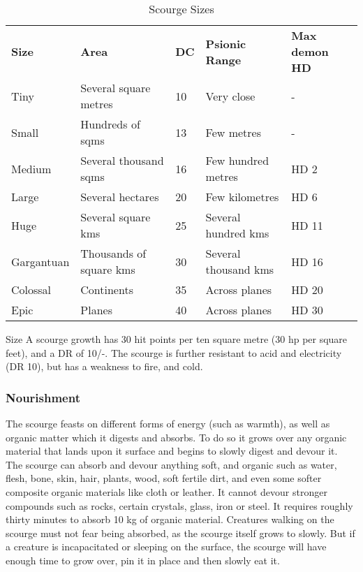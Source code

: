 \begin{table*}[!htb]
  \caption{Scourge Sizes}
  \begin{tabular}{l l l l l}
    \textbf{Size} & \textbf{Area}             & \textbf{DC} & \textbf{Psionic Range} & \textbf{Max demon HD} \\
    Tiny          & Several square metres     & 10          & Very close             & - \\
    Small         & Hundreds of sqms          & 13          & Few metres             & - \\
    Medium        & Several thousand sqms     & 16          & Few hundred metres     & HD 2 \\
    Large         & Several hectares          & 20          & Few kilometres         & HD 6 \\
    Huge          & Several square kms        & 25          & Several hundred kms    & HD 11 \\
    Gargantuan    & Thousands of square kms   & 30          & Several thousand kms   & HD 16 \\
    Colossal      & Continents                & 35          & Across planes          & HD 20 \\
    Epic          & Planes                    & 40          & Across planes          & HD 30 \\
  \end{tabular}
\end{table*}

\begin{35e}{Size}
  A scourge growth has 30 hit points per ten square metre (30 hp per square
  feet), and a DR of 10/-. The scourge is further resistant to acid and
  electricity (DR 10), but has a weakness to fire, and cold.
\end{35e}

\subsubsection{Nourishment}

The scourge feasts on different forms of energy (such as warmth), as well as
organic matter which it digests and absorbs. To do so it grows over any
organic material that lands upon it surface and begins to slowly digest and
devour it. The scourge can absorb and devour anything soft, and organic such as
water, flesh, bone, skin, hair, plants, wood, soft fertile dirt, and even some
softer composite organic materials like cloth or leather. It cannot devour
stronger compounds such as rocks, certain crystals, glass, iron or steel. It
requires roughly thirty minutes to absorb 10 kg of organic material. Creatures
walking on the scourge must not fear being absorbed, as the scourge itself
grows to slowly. But if a creature is incapacitated or sleeping on the
surface, the scourge will have enough time to grow over, pin it in place and
then slowly eat it.

